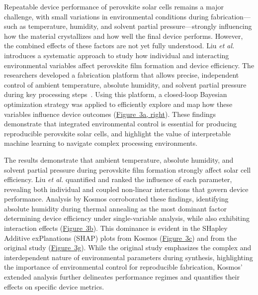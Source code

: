 \documentclass{article}
\begin{document}
Repeatable device performance of perovskite solar cells remains a major challenge, with small variations in environmental conditions during fabrication---such as temperature, humidity, and solvent partial pressure---strongly influencing how the material crystallizes and how well the final device performs. However, the combined effects of these factors are not yet fully understood. Liu \textit{et al.} introduces a systematic approach to study how individual and interacting environmental variables affect perovskite film formation and device efficiency. The researchers developed a fabrication platform that allows precise, independent control of ambient temperature, absolute humidity, and solvent partial pressure during key processing steps~\cite{liu_disentangling_2025}. Using this platform, a closed-loop Bayesian optimization strategy was applied to efficiently explore and map how these variables influence device outcomes (\hyperref[fig:fig3]{Figure~3a, right}). These findings demonstrate that integrated environmental control is essential for producing reproducible perovskite solar cells, and highlight the value of interpretable machine learning to navigate complex processing environments.

The results demonstrate that ambient temperature, absolute humidity, and solvent partial pressure during perovskite film formation strongly affect solar cell efficiency. Liu \textit{et al.} quantified and ranked the influence of each parameter, revealing both individual and coupled non-linear interactions that govern device performance. Analysis by Kosmos corroborated these findings, identifying absolute humidity during thermal annealing as the most dominant factor determining device efficiency under single-variable analysis, while also exhibiting interaction effects (\hyperref[fig:fig3]{Figure~3b}). This dominance is evident in the SHapley Additive exPlanations (SHAP) plots from Kosmos (\hyperref[fig:fig3]{Figure~3c}) and from the original study (\hyperref[fig:fig3]{Figure~3g}). While the original study emphasizes the complex and interdependent nature of environmental parameters during synthesis, highlighting the importance of environmental control for reproducible fabrication, Kosmos’ extended analysis further delineates performance regimes and quantifies their effects on specific device metrics.
\end{document}
